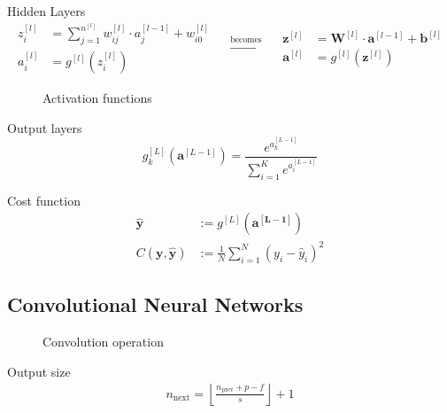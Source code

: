 \begin{frame}
  \begin{block}{Hidden Layers}
    \begin{equation*}
      \begin{aligned}
        z_i^{[l]} &= \sum_{j = 1}^{n^{[l]}} w_{ij}^{[l]} \cdot a_j^{[l - 1]} + w_{i0}^{[l]} \\
        a_i^{[l]} &= g^{[l]}(z_i^{[l]})
      \end{aligned}
      \quad
      \xrightarrow{\text{becomes}}
      \quad
      \begin{aligned}
        \bm{z}^{[l]} &= \bm{W}^{[l]} \cdot \bm{a}^{[l - 1]} + \bm{b}^{[l]} \\
        \bm{a}^{[l]} &= g^{[l]}(\bm{z}^{[l]})
      \end{aligned}
    \end{equation*}
  
  \end{block}
  \begin{figure}
    \centering
    
  
    \caption[Activation functions]{
      Activation functions
    }
  \end{figure}
\end{frame}

\begin{frame}
  \begin{block}{Output layers}
    \[
      g_k^{[L]}(\bm{a}^{[L - 1]}) = \frac{e^{a_k^{[L - 1]}}}{\sum_{i = 1}^K e^{a_i^{[L - 1]}}}
    \]
  \end{block}
  
  \begin{block}{Cost function}
    \begin{align*}
      \hat{\bm{y}} &:= g^{[L]}(\bm{a^{[L - 1]}}) \\
      C(\bm{y}, \hat{\bm{y}}) &:= \frac{1}{N} \sum_{i = 1}^N (y_i - \hat{y}_i)^2
    \end{align*}
  \end{block}
\end{frame}

\subsection{Convolutional Neural Networks}

\begin{frame}{\insertsubsec}
  \centering
  \begin{figure}
    \hspace{-7cm}

    \caption{Convolution operation}
  \end{figure}

  \begin{block}{Output size}
    \begin{align*}
      n_{\text{next}} = \left\lfloor\frac{n_{\text{prev}} + p - f}{s}\right\rfloor + 1
    \end{align*}
  \end{block} 
\end{frame}

